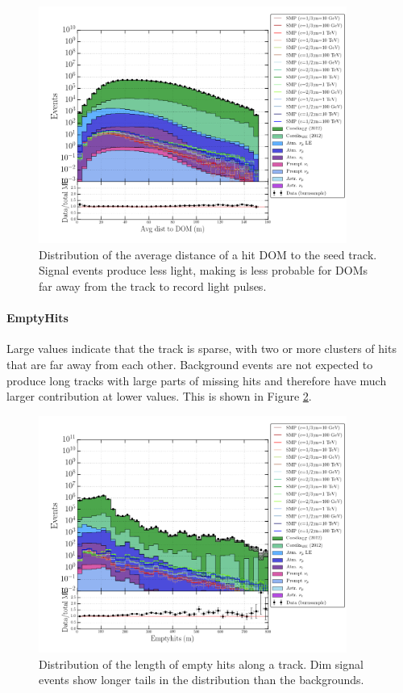 \begin{figure}
\centering
\includegraphics[width = 0.9\textwidth]{chapter8/img/1D_stack_avdistdom_150.png}
\caption{Distribution of the average distance of a hit DOM to the seed track. Signal events produce less light, making is less probable for DOMs far away from the track to record light pulses.}
\label{fig:commonvariablesavgdistdom150}
\end{figure}

\paragraph{EmptyHits}
Large values indicate that the track is sparse, with two or more clusters of hits that are far away from each other. Background events are not expected to produce long tracks with large parts of missing hits and therefore have much larger contribution at lower values. This is shown in Figure \ref{fig:commonvariablesemptyhits100}.

\begin{figure}
\centering
\includegraphics[width = 0.9\textwidth]{chapter8/img/1D_stack_emptyhits_100.png}
\caption{Distribution of the length of empty hits along a track. Dim signal events show longer tails in the distribution than the backgrounds.}
\label{fig:commonvariablesemptyhits100}
\end{figure}

